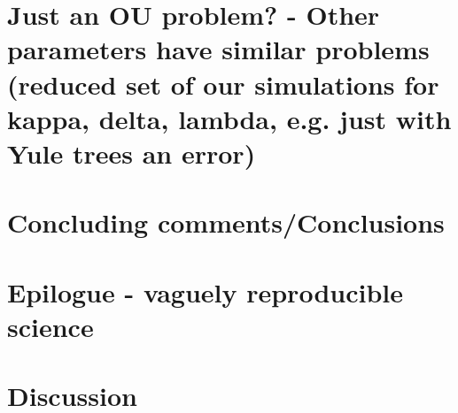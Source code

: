 \documentclass[a4paper,12pt]{article}
\begin{document}
\section{Just an OU problem? - Other parameters have similar problems (reduced set of our simulations for kappa, delta, lambda, e.g. just with Yule trees an error)}


\section{Concluding comments/Conclusions}
\section{Epilogue - vaguely reproducible science}



\section{Discussion}

\end{document}
